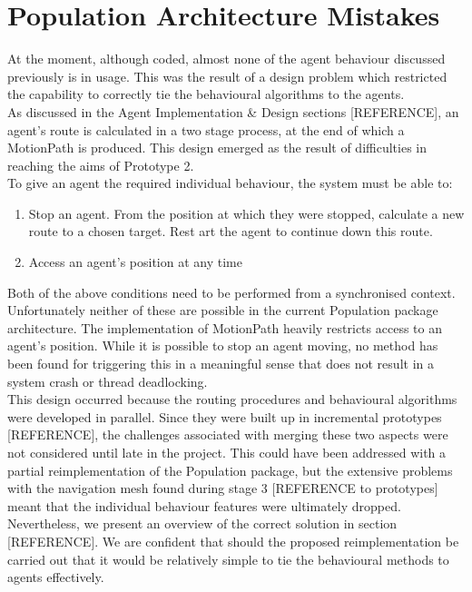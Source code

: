 \documentclass{article}
\begin{document}
\section{Population Architecture Mistakes } %
At the moment, although coded, almost none of the agent behaviour discussed previously is in usage. This was the result of a design problem which restricted the capability to correctly tie the behavioural algorithms to the agents.\\
As discussed in the Agent Implementation \& Design sections [REFERENCE], an agent's route is calculated in a two stage process, at the end of which a MotionPath is produced. This design emerged as the result of difficulties in reaching the aims of Prototype 2.\\
To give an agent the required individual behaviour, the system must be able to:
\begin{enumerate}
\item{Stop an agent. From the position at which they were stopped, calculate a new route to a chosen target. Rest art the agent to continue down this route.}
\item{Access an agent's position at any time}
\end{enumerate}
Both of the above conditions need to be performed from a synchronised context. Unfortunately neither of these are possible in the current Population package architecture. The implementation of MotionPath heavily restricts access to an agent's position. While it is possible to stop an agent moving, no method has been found for triggering this in a meaningful sense that does not result in a system crash or thread deadlocking.\\
This design occurred because the routing procedures and behavioural algorithms were developed in parallel. Since they were built up in incremental prototypes [REFERENCE], the challenges associated with merging these two aspects were not considered until late in the project. This could have been addressed with a partial reimplementation of the Population package, but the extensive problems with the navigation mesh found during stage 3 [REFERENCE to prototypes] meant that the individual behaviour features were ultimately dropped.\\
Nevertheless, we present an overview of the correct solution in section [REFERENCE]. We are confident that should the proposed reimplementation be carried out that it would be relatively simple to tie the behavioural methods to agents effectively.
\end{document}
